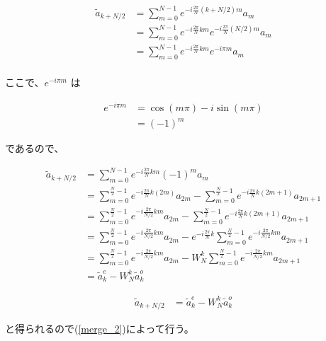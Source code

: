 
\begin{align*}
    \tilde{a}_{k + N/2} &= \sum_{m = 0}^{N - 1} e^{-i\frac{2\pi}{N} (k + N/2)m} a_m \\
                        &= \sum_{m = 0}^{N - 1} e^{-i\frac{2\pi}{N}km} e^{-i\frac{2\pi}{N}(N/2)m}  a_m \\
                        &= \sum_{m = 0}^{N - 1} e^{-i\frac{2\pi}{N}km} e^{-i\pi m}  a_m \\
\end{align*}

ここで、$e^{-i\pi m}$ は

\begin{align*}
    e^{-i\pi m} &= \cos(m\pi) - i\sin(m\pi)\\
                &= (-1)^m
\end{align*}

であるので、

\begin{align*}
    \tilde{a}_{k + N/2} &= \sum_{m = 0}^{N - 1} e^{-i\frac{2\pi}{N}km} (-1)^m a_m \\
                        &= \sum_{m = 0}^{\frac{N}{2} - 1} e^{-i\frac{2\pi}{N}k(2m)} a_{2m} 
                         - \sum_{m = 0}^{\frac{N}{2} - 1} e^{-i\frac{2\pi}{N}k(2m + 1)} a_{2m + 1} \\
                        &= \sum_{m = 0}^{\frac{N}{2} - 1} e^{-i\frac{2\pi}{N / 2}km} a_{2m} 
                         - \sum_{m = 0}^{\frac{N}{2} - 1} e^{-i\frac{2\pi}{N}k(2m + 1)} a_{2m + 1} \\
                        &= \sum_{m = 0}^{\frac{N}{2} - 1} e^{-i\frac{2\pi}{N / 2}km} a_{2m} 
                         - e^{-i\frac{2\pi}{N}k} \sum_{m = 0}^{\frac{N}{2} - 1} e^{-i\frac{2\pi}{N / 2}km} a_{2m + 1} \\
                        &= \sum_{m = 0}^{\frac{N}{2} - 1} e^{-i\frac{2\pi}{N / 2}km} a_{2m} 
                         - W_N^k \sum_{m = 0}^{\frac{N}{2} - 1} e^{-i\frac{2\pi}{N / 2}km} a_{2m + 1} \\
                        &= \tilde{a}_k^{e} - W_N^k \tilde{a}_k^{o}
\end{align*}

\begin{align}\label{merge_2}
    \tilde{a}_{k + N/2} &= \tilde{a}_k^{e} - W_N^k \tilde{a}_k^{o}
\end{align}

と得られるので(\ref{merge_2})によって行う。
